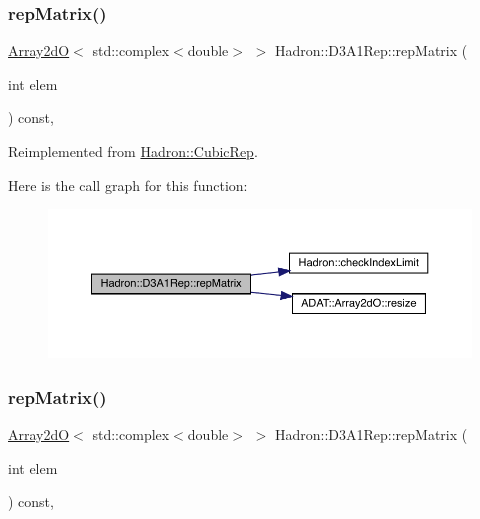 \subsubsection{\texorpdfstring{repMatrix()}{repMatrix()}\hspace{0.1cm}{\footnotesize\ttfamily [1/3]}}
{\footnotesize\ttfamily \mbox{\hyperlink{classADAT_1_1Array2dO}{Array2dO}}$<$ std\+::complex$<$double$>$ $>$ Hadron\+::\+D3\+A1\+Rep\+::rep\+Matrix (\begin{DoxyParamCaption}\item[{int}]{elem }\end{DoxyParamCaption}) const\hspace{0.3cm}{\ttfamily [inline]}, {\ttfamily [virtual]}}



Reimplemented from \mbox{\hyperlink{structHadron_1_1CubicRep_ac5d7e9e6f4ab1158b5fce3e4ad9e8005}{Hadron\+::\+Cubic\+Rep}}.

Here is the call graph for this function\+:
\nopagebreak
\begin{figure}[H]
\begin{center}
\leavevmode
\includegraphics[width=350pt]{d4/df6/structHadron_1_1D3A1Rep_a618d921105d92d30f7b3c838af644a74_cgraph}
\end{center}
\end{figure}
\mbox{\label{structHadron_1_1D3A1Rep_a618d921105d92d30f7b3c838af644a74}} 
\subsubsection{\texorpdfstring{repMatrix()}{repMatrix()}\hspace{0.1cm}{\footnotesize\ttfamily [2/3]}}
{\footnotesize\ttfamily \mbox{\hyperlink{classADAT_1_1Array2dO}{Array2dO}}$<$ std\+::complex$<$double$>$ $>$ Hadron\+::\+D3\+A1\+Rep\+::rep\+Matrix (\begin{DoxyParamCaption}\item[{int}]{elem }\end{DoxyParamCaption}) const\hspace{0.3cm}{\ttfamily [inline]}, {\ttfamily [virtual]}}



